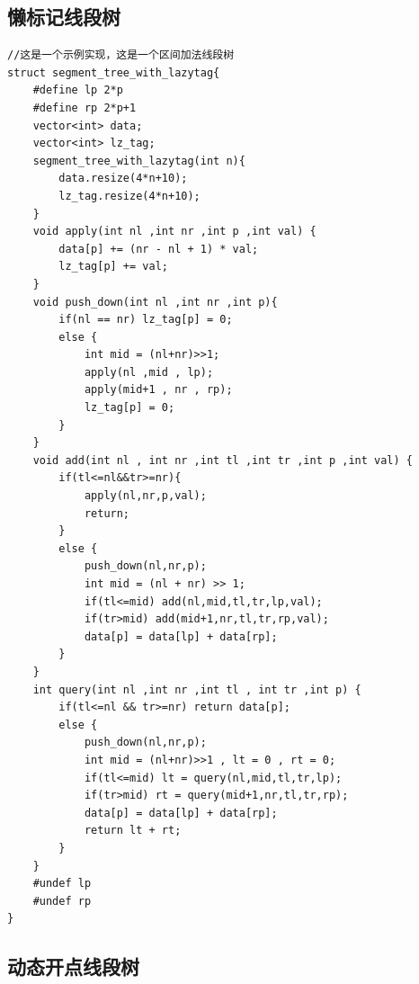 \subsection{懒标记线段树}

\begin{lstlisting}
//这是一个示例实现，这是一个区间加法线段树
struct segment_tree_with_lazytag{
    #define lp 2*p
    #define rp 2*p+1
    vector<int> data;
    vector<int> lz_tag;
    segment_tree_with_lazytag(int n){
        data.resize(4*n+10);
        lz_tag.resize(4*n+10);
    }
    void apply(int nl ,int nr ,int p ,int val) {
        data[p] += (nr - nl + 1) * val;
        lz_tag[p] += val;
    }
    void push_down(int nl ,int nr ,int p){
        if(nl == nr) lz_tag[p] = 0;
        else {
            int mid = (nl+nr)>>1;
            apply(nl ,mid , lp);
            apply(mid+1 , nr , rp);
            lz_tag[p] = 0;
        }
    }
    void add(int nl , int nr ,int tl ,int tr ,int p ,int val) {
        if(tl<=nl&&tr>=nr){
            apply(nl,nr,p,val);
            return;
        }
        else {
            push_down(nl,nr,p);
            int mid = (nl + nr) >> 1;
            if(tl<=mid) add(nl,mid,tl,tr,lp,val);
            if(tr>mid) add(mid+1,nr,tl,tr,rp,val);
            data[p] = data[lp] + data[rp];
        }
    }
    int query(int nl ,int nr ,int tl , int tr ,int p) {
        if(tl<=nl && tr>=nr) return data[p];
        else {
            push_down(nl,nr,p);
            int mid = (nl+nr)>>1 , lt = 0 , rt = 0;
            if(tl<=mid) lt = query(nl,mid,tl,tr,lp);
            if(tr>mid) rt = query(mid+1,nr,tl,tr,rp);
            data[p] = data[lp] + data[rp];
            return lt + rt;
        }
    }
    #undef lp
    #undef rp
}
\end{lstlisting}

\subsection{动态开点线段树}


